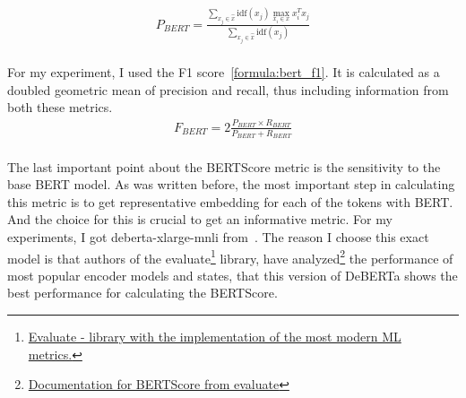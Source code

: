 \begin{align}\label{formula:bert_precision}
    P_{BERT} = \frac{\sum_{x_j \in \hat{x} } \text{idf}(x_j) \max_{x_i \in x} x_i^T x_j}{\sum_{x_j \in \hat{x}} \text{idf}(x_j)}
\end{align}\\
For my experiment, I used the F1 score~\ref{formula:bert_f1}. It is calculated as a doubled geometric mean of precision and recall, thus including information from both these metrics. 
\begin{align}\label{formula:bert_f1}
    F_{BERT} = 2\frac{P_{BERT} \times R_{BERT}}{P_{BERT} + R_{BERT}}
\end{align}\\
The last important point about the BERTScore metric is the sensitivity to the base BERT model. As was written before, the most important step in calculating this metric is to get representative embedding for each of the tokens with BERT\@. And the choice for this is crucial to get an informative metric. For my experiments, I got deberta-xlarge-mnli from~\cite{he2021deberta}. The reason I choose this exact model is that authors of the evaluate\footnote[1]{\href{https://huggingface.co/docs/evaluate/index}{Evaluate - library with the implementation of the most modern ML metrics.}} library, have analyzed\footnote[1]{\href{https://huggingface.co/spaces/evaluate-metric/bertscore}{Documentation for BERTScore from evaluate}} the performance of most popular encoder models and states, that this version of DeBERTa shows the best performance for calculating the BERTScore.